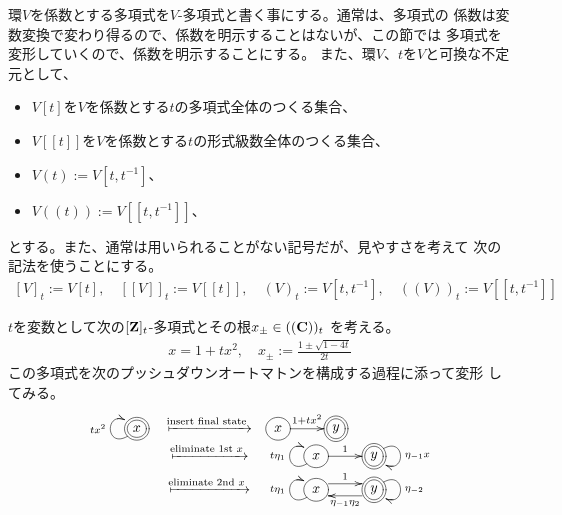 {	環$V$を係数とする多項式を$V$-多項式と書く事にする。通常は、多項式の
	係数は変数変換で変わり得るので、係数を明示することはないが、この節では
	多項式を変形していくので、係数を明示することにする。
	また、環$V$、$t$を$V$と可換な不定元として、
	\begin{itemize}\setlength{\itemsep}{-1mm} %
		\item $V[t]$を$V$を係数とする$t$の多項式全体のつくる集合、
		\item $V[[t]]$を$V$を係数とする$t$の形式級数全体のつくる集合、
		\item $V(t):=V[t,t^{-1}]$、
		\item $V((t)):=V[[t,t^{-1}]]$、
	\end{itemize} %
	とする。また、通常は用いられることがない記号だが、見やすさを考えて
	次の記法を使うことにする。
	\begin{equation*}\begin{split}
		[V]_t:=V[t],\quad [[V]]_t:=V[[t]],\quad (V)_t:=V[t,t^{-1}]
		,\quad ((V))_t:=V[[t,t^{-1}]]
	\end{split}\end{equation*}

	$t$を変数として次の$[\mathbf{Z}]_t$-多項式とその根$x_\pm\in((\mathbf{C}))_t$
	を考える。
	\begin{equation}\label{eq:元の多項式}\begin{split}
		x = 1 + tx^2,\quad x_\pm := \frac{1 \pm \sqrt{1 - 4t}}{2t}
	\end{split}\end{equation}
	この多項式を次のプッシュダウンオートマトンを構成する過程に添って変形
	してみる。
	\begin{equation*}\begin{array}{rcll}
		\xymatrix{
			*++[o][F=]{x} \ar@(dl,ul)^{tx^2}
		} &\xmapsto{\text{insert final state}}& \xymatrix{
			*++[o][F-]{x} \ar[r]^{1+tx^2} & *++[o][F=]{y}
		} \\
		&\xmapsto{\text{eliminate 1st $x$}}& \xymatrix{
			*++[o][F-]{x} \ar[r]^{1} \ar@(dl,ul)^{t\eta_1} 
			& *++[o][F=]{y} \ar@(ru,rd)^{\eta_{-1}x}
		} \\
		&\xmapsto{\text{eliminate 2nd $x$}}& \xymatrix{
			*++[o][F-]{x} \ar@<1ex>[r]^{1} \ar@(dl,ul)^{t\eta_1} 
			& *++[o][F=]{y} \ar@(ru,rd)^{\eta_{-2}} \ar@<1ex>[l]^{\eta_{-1}\eta_2}
		}
	\end{array}\end{equation*}

}
